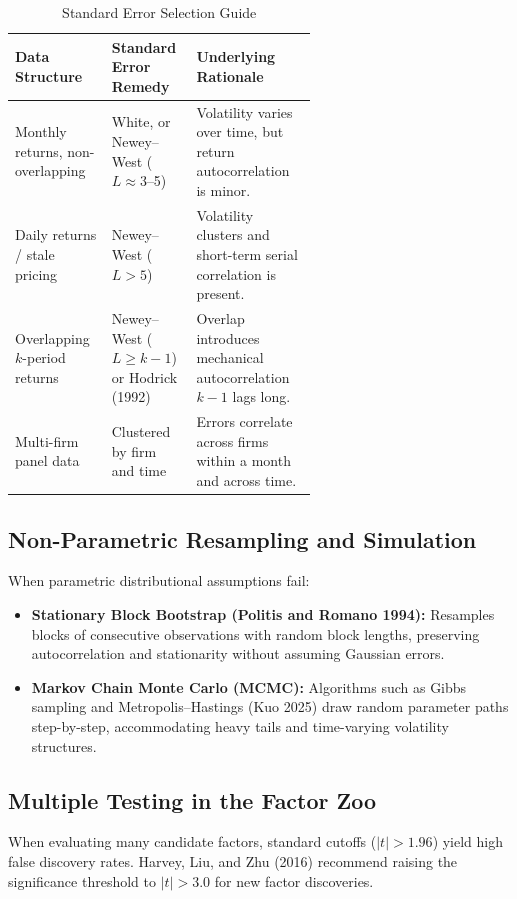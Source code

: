 \begin{table}[htbp]
\centering
\small
\caption{Standard Error Selection Guide}
\label{tab:03-se-guide}
\begin{tabularx}{0.95\linewidth}{@{}>{\raggedright\arraybackslash}p{0.32\linewidth}>{\raggedright\arraybackslash}p{0.28\linewidth}>{\raggedright\arraybackslash}X@{}}
\toprule
Data Structure & Standard Error Remedy & Underlying Rationale \\
\midrule
Monthly returns, non-overlapping & White, or Newey--West ($L \approx 3$--5) & Volatility varies over time, but return autocorrelation is minor. \\
Daily returns / stale pricing & Newey--West ($L > 5$) & Volatility clusters and short-term serial correlation is present. \\
Overlapping $k$-period returns & Newey--West ($L \ge k-1$) or Hodrick (1992) & Overlap introduces mechanical autocorrelation $k-1$ lags long. \\
Multi-firm panel data & Clustered by firm and time & Errors correlate across firms within a month and across time. \\
\bottomrule
\end{tabularx}
\end{table}

\subsection{Non-Parametric Resampling and Simulation}
\label{sec:03-bootstrap}
When parametric distributional assumptions fail:
\begin{itemize}
  \item \textbf{Stationary Block Bootstrap (Politis and Romano 1994):} Resamples blocks of consecutive observations with random block lengths, preserving autocorrelation and stationarity without assuming Gaussian errors.
  \item \textbf{Markov Chain Monte Carlo (MCMC):} Algorithms such as Gibbs sampling and Metropolis--Hastings (Kuo 2025) draw random parameter paths step-by-step, accommodating heavy tails and time-varying volatility structures.
\end{itemize}

\subsection{Multiple Testing in the Factor Zoo}
When evaluating many candidate factors, standard cutoffs ($|t| > 1.96$) yield high false discovery rates. Harvey, Liu, and Zhu (2016) recommend raising the significance threshold to $|t| > 3.0$ for new factor discoveries.

